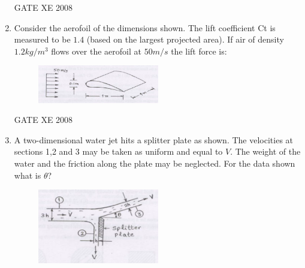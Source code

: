 \documentclass[12pt]{article}
\begin{document}
\begin{enumerate}
\begin{enumerate}
\end{enumerate}


GATE XE 2008
\item  Consider the aerofoil of the dimensions shown. The lift coefficient Ct is measured to be $1.4$ (based on the largest projected area). If air of density $1.2 kg/m^3$ flows over the aerofoil at $50 m/s$ the lift force is:

\begin{figure}[H]
\centering
  \includegraphics[width=0.5\textwidth]{figs/ass1_d_q14.png}
  \caption{}
\end{figure} 

\begin{enumerate}
\end{enumerate}

GATE XE 2008
\item A two-dimensional water jet hits a splitter plate as shown. The velocities at sections 1,2 and 3 may be taken as uniform and equal to $V$. The weight of the water and the friction along the plate may be neglected. For the data shown what is $\theta$?

\begin{figure}[H]
\centering
  \includegraphics[width=0.5\textwidth]{figs/ass1_d_q15.png}
  \caption{}
\end{figure} 


\end{enumerate}
\end{document}
